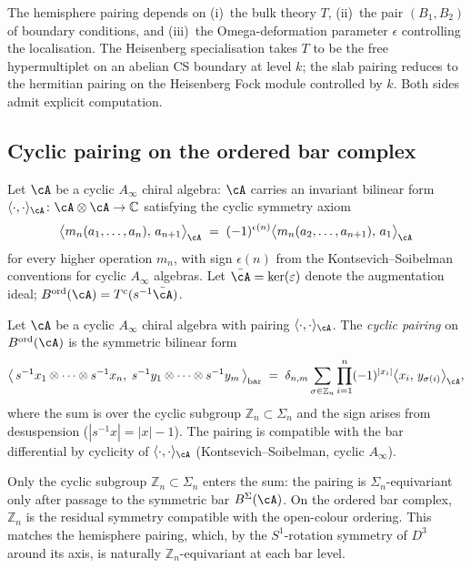 \begin{remark}
\label{rem:hemisphere-three-inputs}
The hemisphere pairing depends on (i)~the bulk theory $T$,
(ii)~the pair $(B_1,B_2)$ of boundary conditions, and (iii)~the
Omega-deformation parameter $\epsilon$ controlling the
localisation. The Heisenberg specialisation takes $T$ to be the free
hypermultiplet on an abelian CS boundary at level $k$; the slab pairing
reduces to the hermitian pairing on the Heisenberg Fock module
controlled by $k$. Both sides admit explicit computation.
\end{remark}

\subsection{Cyclic pairing on the ordered bar complex}
\label{subsec:cyclic-pairing-bar}

Let $\cA$ be a cyclic $A_\infty$ chiral algebra: $\cA$ carries
an invariant bilinear form
$\langle\cdot,\cdot\rangle_\cA\colon \cA\otimes\cA \to \mathbb C$
satisfying the cyclic symmetry axiom
\[
 \bigl\langle m_n(a_1,\ldots,a_n),\, a_{n+1}\bigr\rangle_\cA
 \;=\;
 (-1)^{\epsilon(n)}
 \bigl\langle m_n(a_2,\ldots,a_{n+1}),\, a_1\bigr\rangle_\cA
\]
for every higher operation $m_n$, with sign
$\epsilon(n)$ from the Kontsevich--Soibelman conventions for
cyclic $A_\infty$ algebras. Let $\bar\cA = \ker(\varepsilon)$
denote the augmentation ideal;
$B^{\mathrm{ord}}(\cA) = T^c(s^{-1}\bar\cA)$.

\begin{definition}
\label{def:cyclic-pairing-bar}
Let $\cA$ be a cyclic $A_\infty$ chiral algebra with pairing
$\langle\cdot,\cdot\rangle_\cA$. The \emph{cyclic pairing} on
$B^{\mathrm{ord}}(\cA)$ is the symmetric bilinear form
\[
 \bigl\langle\,
 s^{-1}x_1\otimes\cdots\otimes s^{-1}x_n,\;
 s^{-1}y_1\otimes\cdots\otimes s^{-1}y_m
 \,\bigr\rangle_{\mathrm{bar}}
 \;=\;
 \delta_{n,m}\sum_{\sigma\in \mathbb Z_n}
 \prod_{i=1}^n
 (-1)^{|x_i|}
 \bigl\langle x_i,\, y_{\sigma(i)}\bigr\rangle_\cA ,
\]
where the sum is over the cyclic subgroup $\mathbb Z_n \subset
\Sigma_n$ and the sign arises from desuspension
($|s^{-1}x|=|x|-1$). The pairing is compatible with the
bar differential by cyclicity of $\langle\cdot,\cdot\rangle_\cA$
(Kontsevich--Soibelman, cyclic $A_\infty$).
\end{definition}

\begin{remark}
\label{rem:cyclic-not-full-symmetric}
Only the cyclic subgroup $\mathbb Z_n \subset \Sigma_n$ enters
the sum: the pairing is $\Sigma_n$-equivariant only after passage
to the symmetric bar $B^\Sigma(\cA)$. On the ordered bar
complex, $\mathbb Z_n$ is the residual symmetry compatible with
the open-colour ordering. This matches the hemisphere
pairing, which, by the $S^1$-rotation symmetry of $D^3$ around
its axis, is naturally $\mathbb Z_n$-equivariant at each bar
level.
\end{remark}

